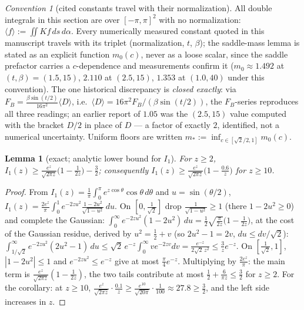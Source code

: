 \documentclass[11pt]{article}
\newtheorem{lemma}[theorem]{Lemma}
\theoremstyle{remark}
\newtheorem{convention}[theorem]{Convention}
\newcommand{\FB}{F_{\!B}}
\begin{document}
\begin{convention}[cited constants travel with their normalization]
\label{conv:mass}
All double integrals in this section are over $[-\pi,\pi]^2$ with no
normalization: $\langle f\rangle:=\iint K f\,ds\,d\alpha$. Every
numerically measured constant quoted in this manuscript travels with
its triplet \textup{(}normalization, $t$, $\beta$\textup{)}; the
saddle-mass lemma is stated as an explicit function $m_0(c)$,
never as a loose scalar, since the saddle prefactor carries a
$c$-dependence and measurements confirm it
\textup{(}$m_0\approx1.492$ at $(t,\beta)=(1.5,15)$, $2.110$ at
$(2.5,15)$, $1.353$ at $(1.0,40)$ under this convention\textup{)}.
The one historical discrepancy is \emph{closed exactly}: via
$\FB=\frac{\beta\sin(t/2)}{16\pi^2}\langle D\rangle$, i.e.\
$\langle D\rangle=16\pi^2\FB/(\beta\sin(t/2))$, the $\FB$-series
reproduces all three readings; an earlier report of $1.05$ was the
$(2.5,15)$ value computed with the bracket $D/2$ in place of $D$
--- a factor of exactly $2$, identified, not a numerical
uncertainty. Uniform floors are written $m_*:=\inf_{c\in[\sqrt2/2,1]}
m_0(c)$.
\end{convention}

\begin{lemma}[exact; analytic lower bound for $I_1$]
\label{lem:I1low}
For $z\ge2$,
$I_1(z)\ge\frac{e^z}{\sqrt{2\pi z}}\bigl(1-\frac1{2z}\bigr)
-\frac32$; consequently
$I_1(z)\ge\frac{e^z}{\sqrt{2\pi z}}\bigl(1-\frac{0.6}{z}\bigr)$
for $z\ge10$.
\end{lemma}

\begin{proof}
From $I_1(z)=\frac1\pi\int_0^\pi e^{z\cos\theta}\cos\theta\,
d\theta$ and $u=\sin(\theta/2)$,
$I_1(z)=\frac{2e^z}{\pi}\int_0^1e^{-2zu^2}
\frac{1-2u^2}{\sqrt{1-u^2}}\,du$. On $[0,\tfrac1{\sqrt2}]$ drop
$\frac1{\sqrt{1-u^2}}\ge1$ (there $1-2u^2\ge0$) and complete the
Gaussian: $\int_0^\infty e^{-2zu^2}(1-2u^2)\,du=\tfrac12
\sqrt{\tfrac{\pi}{2z}}\bigl(1-\tfrac1{2z}\bigr)$, at the cost of
the Gaussian residue, derived by $u^2=\tfrac12+v$
\textup{(}so $2u^2-1=2v$, $du\le dv/\sqrt2$\textup{)}:
$\int_{1/\sqrt2}^\infty e^{-2zu^2}(2u^2-1)\,du\le
\sqrt2\,e^{-z}\!\int_0^\infty ve^{-2zv}dv=
\frac{e^{-z}}{2\sqrt2\,z^2}\le\tfrac{3}{z}e^{-z}$. On $[\tfrac1{\sqrt2},1]$,
$|1-2u^2|\le1$ and $e^{-2zu^2}\le e^{-z}$ give at most
$\tfrac{\pi}{4}e^{-z}$. Multiplying by $\tfrac{2e^z}{\pi}$: the
main term is $\frac{e^z}{\sqrt{2\pi z}}(1-\tfrac1{2z})$, the two
tails contribute at most $\tfrac12+\tfrac{6}{\pi z}\le\tfrac32$ for
$z\ge2$. For the corollary: at $z\ge10$,
$\frac{e^z}{\sqrt{2\pi z}}\cdot\frac{0.1}{z}\ge
\frac{e^{10}}{\sqrt{20\pi}}\cdot\frac{1}{100}\approx27.8\ge\frac32$,
and the left side increases in $z$.
\end{proof}
\end{document}
